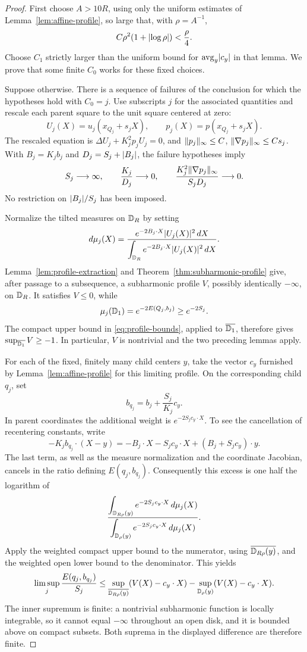 \begin{proof}
First choose \(A>10R\), using only the uniform estimates of
Lemma~\ref{lem:affine-profile}, so large that, with \(\rho=A^{-1}\),
\[
 C\rho^2(1+\lvert\log\rho\rvert)<\frac\rho4.
\]
Choose \(C_1\) strictly larger than the uniform bound for
\(\operatorname{avg}_y\lvert c_y\rvert\) in that lemma.  We prove that some finite
\(C_0\) works for these fixed choices.

Suppose otherwise.  There is a sequence of failures of the
conclusion for which the hypotheses hold with \(C_0=j\).
Use subscripts \(j\) for the associated quantities and rescale each
parent square to the unit square centered at zero:
\[
 U_j(X)=u_j(x_{Q_j}+s_jX),
 \qquad p_j(X)=p(x_{Q_j}+s_jX).
\]
The rescaled equation is
\(\Delta U_j+K_j^2p_jU_j=0\), and
\(\lVert p_j\rVert_\infty\le C\),
\(\lVert\nabla p_j\rVert_\infty\le Cs_j\).
With \(B_j=K_jb_j\) and \(D_j=S_j+\lvert B_j\rvert\), the failure
hypotheses imply
\[
 S_j\longrightarrow\infty,\qquad
 \frac{K_j}{D_j}\longrightarrow0,\qquad
 \frac{K_j^2\lVert\nabla p_j\rVert_\infty}{S_jD_j}
 \longrightarrow0.
\]
No restriction on \(\lvert B_j\rvert/S_j\) has been imposed.

Normalize the tilted measures on \(\mathbb D_R\) by setting
\[
 d\mu_j(X)=
 \frac{e^{-2B_j\cdot X}\lvert U_j(X)\rvert^2\,dX}
 {\displaystyle\int_{\mathbb D_R}e^{-2B_j\cdot X}\lvert U_j(X)\rvert^2\,dX}.
\]
Lemma~\ref{lem:profile-extraction} and
Theorem~\ref{thm:subharmonic-profile} give, after passage to a
subsequence, a subharmonic profile \(V\), possibly identically
\(-\infty\), on \(\mathbb D_R\).  It satisfies \(V\le0\), while
\[
 \mu_j(\mathbb D_1)=e^{-2E(Q_j,b_j)}\ge e^{-2S_j}.
\]
The compact upper bound in \eqref{eq:profile-bounds}, applied to
\(\overline{\mathbb D_1}\), therefore gives
\(\sup_{\overline{\mathbb D_1}}V\ge-1\).  In particular, \(V\) is
nontrivial and the two preceding lemmas apply.

For each of the fixed, finitely many child centers \(y\), take
the vector \(c_y\) furnished by Lemma~\ref{lem:affine-profile} for
this limiting profile.  On the corresponding child \(q_j\), set
\[
 b_{q_j}=b_j+\frac{S_j}{K_j}c_y.
\]
In parent coordinates the additional weight is
\(e^{-2S_jc_y\cdot X}\).  To see the cancellation of recentering
constants, write
\[
 -K_jb_{q_j}\cdot(X-y)
 =-B_j\cdot X-S_jc_y\cdot X
   +(B_j+S_jc_y)\cdot y.
\]
The last term, as well as the measure normalization and the
coordinate Jacobian, cancels in the ratio defining \(E(q_j,b_{q_j})\).
Consequently this excess is one half the logarithm of
\[
 \frac{\displaystyle\int_{\mathbb D_{R\rho}(y)}
                  e^{-2S_jc_y\cdot X}\,d\mu_j(X)}
      {\displaystyle\int_{\mathbb D_\rho(y)}
                  e^{-2S_jc_y\cdot X}\,d\mu_j(X)}.
\]
Apply the weighted compact upper bound to the numerator, using
\(\overline{\mathbb D_{R\rho}(y)}\), and the weighted open lower bound
to the denominator.  This yields
\[
 \limsup_j\frac{E(q_j,b_{q_j})}{S_j}
 \le
 \sup_{\overline{\mathbb D_{R\rho}(y)}}(V(X)-c_y\cdot X)
 -\sup_{\mathbb D_\rho(y)}(V(X)-c_y\cdot X).
\]
The inner supremum is finite: a nontrivial subharmonic function is
locally integrable, so it cannot equal \(-\infty\) throughout an
open disk, and it is bounded above on compact subsets.  Both
suprema in the displayed difference are therefore finite.


\end{proof}
